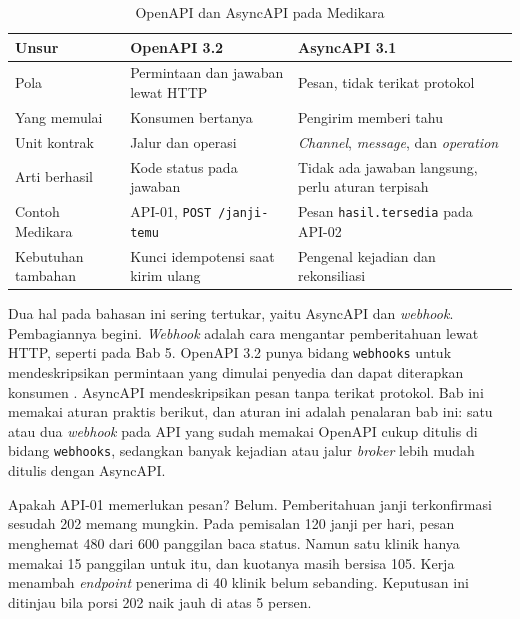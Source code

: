 \begin{table}[!htb]
  \centering
  \caption{OpenAPI dan AsyncAPI pada Medikara}
  \label{tab:ch09-openapi-asyncapi}
  \footnotesize
  \begin{tabularx}{\textwidth}{H{2.7cm}GG}
    \hline
    \textbf{Unsur} & \textbf{OpenAPI 3.2} & \textbf{AsyncAPI 3.1} \\ \hline
    Pola & Permintaan dan jawaban lewat HTTP & Pesan, tidak terikat protokol \\ \hline
    Yang memulai & Konsumen bertanya & Pengirim memberi tahu \\ \hline
    Unit kontrak & Jalur dan operasi & \textit{Channel}, \textit{message}, dan \textit{operation} \\ \hline
    Arti berhasil & Kode status pada jawaban & Tidak ada jawaban langsung, perlu aturan terpisah \\ \hline
    Contoh Medikara & API-01, \texttt{POST /janji-temu} & Pesan \texttt{hasil.tersedia} pada API-02 \\ \hline
    Kebutuhan tambahan & Kunci idempotensi saat kirim ulang & Pengenal kejadian dan rekonsiliasi \\ \hline
  \end{tabularx}
\end{table}

Dua hal pada bahasan ini sering tertukar, yaitu AsyncAPI dan \textit{webhook}. Pembagiannya begini. \textit{Webhook} adalah cara mengantar pemberitahuan lewat HTTP, seperti pada Bab 5. OpenAPI 3.2 punya bidang \texttt{webhooks} untuk mendeskripsikan permintaan yang dimulai penyedia dan
dapat diterapkan konsumen \cite{openapi32}. AsyncAPI mendeskripsikan pesan tanpa terikat protokol. Bab ini memakai aturan praktis berikut, dan aturan ini adalah penalaran bab ini: satu atau dua \textit{webhook} pada API yang sudah memakai OpenAPI cukup ditulis di bidang \texttt{webhooks}, sedangkan
banyak kejadian atau jalur \textit{broker} lebih mudah ditulis dengan AsyncAPI.

Apakah API-01 memerlukan pesan? Belum. Pemberitahuan janji terkonfirmasi sesudah 202 memang mungkin. Pada pemisalan 120 janji per hari, pesan menghemat 480 dari 600 panggilan baca status. Namun satu klinik hanya memakai 15 panggilan untuk itu, dan kuotanya masih bersisa 105. Kerja menambah
\textit{endpoint} penerima di 40 klinik belum sebanding. Keputusan ini ditinjau bila porsi 202 naik jauh di atas 5 persen.

